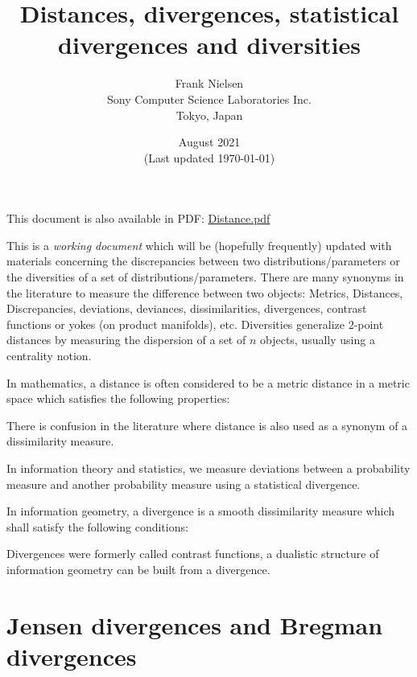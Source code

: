 \documentclass[11pt]{article}
\title{Distances, divergences, statistical divergences and diversities}
\date{August 2021\\ (Last updated \today{})}
\author{Frank Nielsen\\ Sony Computer Science Laboratories Inc.\\ Tokyo, Japan}
\begin{document}
\maketitle

\vskip 0.5cm
This document is also available in PDF: \url{Distance.pdf} 
\vskip 0.5cm


This is a {\em working document} which will be (hopefully frequently) updated with materials concerning the discrepancies between two distributions/parameters or the diversities of a set of distributions/parameters.
There are many synonyms in the literature to measure the difference between two objects: 
Metrics, Distances, Discrepancies, deviations, deviances, dissimilarities, divergences, contrast functions or yokes (on product manifolds), etc.
Diversities generalize $2$-point distances by measuring the dispersion of a set of $n$ objects, usually using a centrality notion.

In mathematics, a distance is often considered to be a metric distance in a metric space which satisfies the following properties:

There is confusion in the literature where distance is also used as a synonym of a dissimilarity measure.

In information theory and statistics, we measure deviations between a probability measure and another probability measure using a statistical divergence.

In information geometry, a divergence is a smooth dissimilarity measure which shall satisfy the following conditions:

Divergences were formerly called contrast functions, a dualistic structure of information geometry can be built from a divergence.
 

\tableofcontents

\section{Jensen divergences and Bregman divergences}\label{sec:JDBD}
\end{document}
